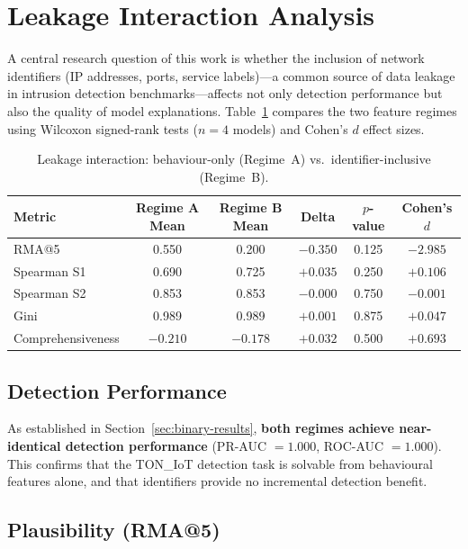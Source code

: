 \documentclass[12pt,a4paper]{report}
\begin{document}
\section{Leakage Interaction Analysis}
\label{sec:leakage-results}

A central research question of this work is whether the inclusion of network identifiers (IP addresses, ports, service labels)---a common source of data leakage in intrusion detection benchmarks---affects not only detection performance but also the quality of model explanations. Table~\ref{tab:leakage} compares the two feature regimes using Wilcoxon signed-rank tests ($n = 4$ models) and Cohen's $d$ effect sizes.

\begin{table}[H]
\centering
\caption{Leakage interaction: behaviour-only (Regime~A) vs.\ identifier-inclusive (Regime~B).}
\label{tab:leakage}
\begin{tabular}{lccccc}
\toprule
\textbf{Metric} & \textbf{Regime A Mean} & \textbf{Regime B Mean} & \textbf{Delta} & \textbf{$p$-value} & \textbf{Cohen's $d$} \\
\midrule
RMA@5 & 0.550 & 0.200 & $-0.350$ & 0.125 & $-2.985$ \\
Spearman S1 & 0.690 & 0.725 & $+0.035$ & 0.250 & $+0.106$ \\
Spearman S2 & 0.853 & 0.853 & $-0.000$ & 0.750 & $-0.001$ \\
Gini & 0.989 & 0.989 & $+0.001$ & 0.875 & $+0.047$ \\
Comprehensiveness & $-0.210$ & $-0.178$ & $+0.032$ & 0.500 & $+0.693$ \\
\bottomrule
\end{tabular}
\end{table}

\subsection*{Detection Performance}

As established in Section~\ref{sec:binary-results}, \textbf{both regimes achieve near-identical detection performance} (PR-AUC $= 1.000$, ROC-AUC $= 1.000$). This confirms that the TON\_IoT detection task is solvable from behavioural features alone, and that identifiers provide no incremental detection benefit.

\subsection*{Plausibility (RMA@5)}
\end{document}

